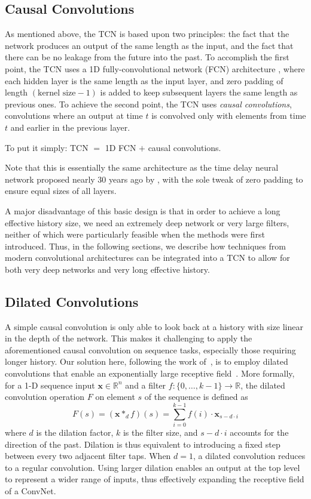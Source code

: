 \documentclass{article}
\begin{document}
\subsection{Causal Convolutions}

As mentioned above, the TCN is based upon two principles: the fact that the
network produces an output of the same length as the input, and the fact that
there can be no leakage from the future into the past.  To accomplish the
first point, the TCN uses a 1D fully-convolutional network (FCN) architecture
\citep{long2015fully}, where each hidden layer is the same length as the input
layer, and zero padding of length $(\mbox{kernel size}-1)$ is added to keep
subsequent layers the same length as previous ones.   To achieve the second
point, the TCN uses \emph{causal convolutions}, convolutions where an
output at time $t$ is convolved only with elements from time $t$ and earlier in the
previous layer.

To put it simply: TCN $=$ 1D FCN $+$ causal convolutions.

Note that this is essentially the same architecture as the time delay neural network proposed
nearly 30 years ago by \citet{waibel}, with the sole tweak of zero padding to ensure equal
sizes of all layers.

A major disadvantage of this basic design is that in order to
achieve a long effective history size, we need an extremely
deep network or very large filters, neither of which were particularly feasible
when the methods were first introduced.  Thus, in the following sections, we
describe how techniques from modern convolutional architectures can be integrated
into a TCN to allow for both very deep networks and very long effective history.

\subsection{Dilated Convolutions}

A simple causal convolution is only able to look back at a history with size linear
in the depth of the network. This makes it challenging to apply the aforementioned causal
convolution on sequence tasks, especially those requiring longer history.
Our solution here, following the work of~\citet{waveNet}, is to employ dilated convolutions
that enable an exponentially large receptive field~\citep{dilatedConv}. More formally, for
a 1-D sequence input $\mathbf{x} \in \mathbb{R}^{n}$ and a filter $f: \{0, \dots, k-1\}
\rightarrow \mathbb{R}$, the dilated convolution operation $F$ on element $s$ of
the sequence is defined as
\vspace{-2mm}
\begin{equation}
F(s) = (\mathbf{x} *_d f)(s) = \sum_{i=0}^{k-1} f(i) \cdot \mathbf{x}_{s-d \cdot i}
\end{equation}
where $d$ is the dilation factor, $k$ is the filter size, and $s-d \cdot i$ accounts
for the direction of the past. Dilation is thus equivalent to introducing a fixed
step between every two adjacent filter taps. When $d=1$, a dilated
convolution reduces to a regular convolution. Using larger dilation enables
an output at the top level to represent a wider range of inputs, thus
effectively expanding the receptive field of a ConvNet.
\end{document}
